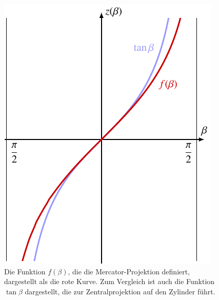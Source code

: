 %
%
%
\begin{figure}
\centering
\includegraphics{chapters/030-kurvenintegral/images/mercator.pdf}
\caption{Die Funktion $f(\beta)$, die die Mercator-Projektion definiert,
dargestellt als die {\color{darkred}rote} Kurve.
Zum Vergleich ist auch die Funktion $\tan\beta$ dargestellt, die zur
Zentralprojektion auf den Zylinder führt.
\label{buch:kurvenintegral:fig:mercator}}
\end{figure}
